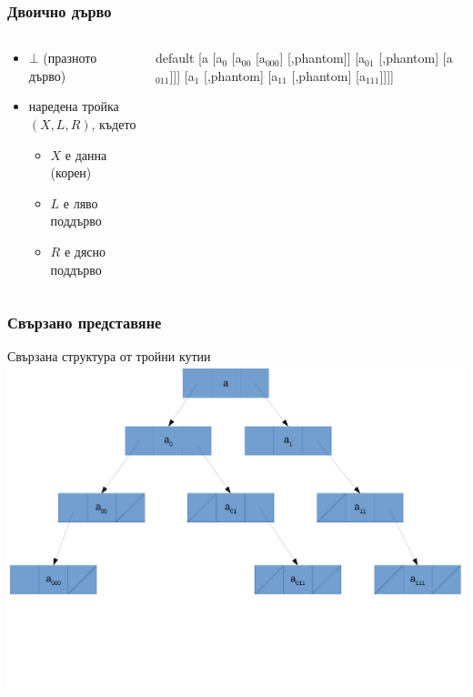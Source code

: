 \documentclass{beamer}
\newcommand{\samplebintree}{%
      \begin{forest}
        default
        [a [a$_0$ [a$_{00}$ [a$_{000}$] [,phantom]] [a$_{01}$ [,phantom] [a$_{011}$]]] [a$_1$ [,phantom] [a$_{11}$ [,phantom] [a$_{111}$]]]]
      \end{forest}%
}
\begin{document}
\begin{frame}
  \frametitle{Двоично дърво}
  \begin{columns}[t,onlytextwidth]
    \begin{column}{0.55\textwidth}
      \begin{definition}
        \begin{itemize}
        \item $\bot$ (празното дърво)
        \item наредена тройка $(X, L, R)$, където
          \begin{itemize}
          \item $X$ е данна (корен)
          \item $L$ е ляво поддърво
          \item $R$ е дясно поддърво
          \end{itemize}
        \end{itemize}
      \end{definition}
    \end{column}
    \begin{column}{0.45\textwidth}
      \vspace{2em}
      \samplebintree
    \end{column}
  \end{columns}
\end{frame}

\begin{frame}
  \frametitle{Свързано представяне}
  Свързана структура от тройни кутии\\[1em]
  \includegraphics[width=\textwidth]{images/bintree.pdf}
\end{frame}
\end{document}

